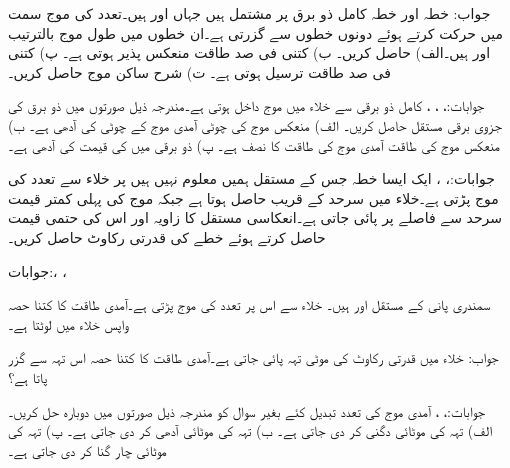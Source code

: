 جواب:
خطہ  اور خطہ  کامل ذو برق پر مشتمل ہیں جہاں  اور  ہیں۔تعدد  کی موج  سمت میں حرکت کرتے ہوئے دونوں خطوں سے گزرتی ہے۔ان خطوں میں طول موج بالترتیب  اور  ہیں۔الف)  حاصل کریں۔ ب) کتنی فی صد طاقت منعکس پذیر ہوتی ہے۔ پ) کتنی فی صد طاقت ترسیل ہوتی ہے۔ ت) شرح ساکن موج  حاصل کریں۔

جوابات:، ، ، 
کامل ذو برقی  سے خلاء میں موج داخل ہوتی ہے۔مندرجہ ذیل صورتوں میں ذو برق کی جزوی برقی مستقل  حاصل کریں۔ الف) منعکس موج کی چوٹی آمدی موج کے چوٹی کی آدھی ہے۔ ب) منعکس موج کی طاقت آمدی موج کی طاقت کا نصف ہے۔ پ) ذو برقی میں  کی قیمت  کی آدھی ہے۔

جوابات:، ، 
ایک ایسا خطہ جس کے مستقل ہمیں معلوم نہیں ہیں پر خلاء سے  تعدد کی موج پڑتی ہے۔خلاء میں سرحد کے قریب  حاصل ہوتا ہے جبکہ موج کی پہلی کمتر قیمت سرحد سے  فاصلے پر پائی جاتی ہے۔انعکاسی مستقل کا زاویہ  اور اس کی حتمی قیمت  حاصل کرتے ہوئے خطے کی قدرتی رکاوٹ حاصل کریں۔

جوابات:، ،    

سمندری پانی کے مستقل  اور  ہیں۔ خلاء سے اس پر  تعدد کی موج پڑتی ہے۔آمدی طاقت کا کتنا حصہ واپس خلاء میں لوٹتا ہے۔

جواب: 
خلاء میں  قدرتی رکاوٹ کی  موٹی تہہ پائی جاتی ہے۔آمدی طاقت کا کتنا حصہ اس تہہ سے گزر پاتا ہے؟ 

جوابات:، ،  
آمدی موج کی تعدد تبدیل کئے بغیر سوال  کو مندرجہ ذیل صورتوں میں دوبارہ حل کریں۔ الف) تہہ کی موٹائی دگنی کر دی جاتی ہے۔ ب) تہہ کی موٹائی آدھی کر دی جاتی ہے۔ پ) تہہ کی موٹائی  چار گنا کر دی جاتی ہے۔

